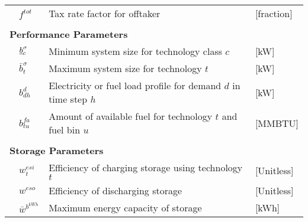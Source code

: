 \begin{longtable}{llll}
&$f^{tot}$              & Tax rate factor for offtaker                                              &[fraction]\\
&&&\\    
\multicolumn{4}{l}{\textbf{Performance Parameters}} \\ \hline
&$\underline{b}^{{\sigma}}_{c}$  & Minimum system size for technology class $c$                                                             &[kW]\\
&$\bar{b}^{{\sigma}}_{t}$       & Maximum system size for technology $t$                                                            &[kW]\\
&$b^{d}_{dh}$                   & Electricity or fuel load profile for demand $d$ in time step $h$                                  &[kW]\\
&$b^{fa}_{tu}$                  & Amount of available fuel for technology $t$ and fuel bin $u$                                      &[MMBTU]\\
&&&\\
\multicolumn{4}{l}{\textbf{Storage Parameters}} \\ \hline
&$w^{esi}_{t}$             & Efficiency of charging storage using technology $t$   &[Unitless]\\
&$w^{eso}$              & Efficiency of discharging storage          &[Unitless]\\
&$\bar{w}^{b^{kWh}}$        & Maximum energy capacity of storage                               &[kWh]\\

\end{longtable}
